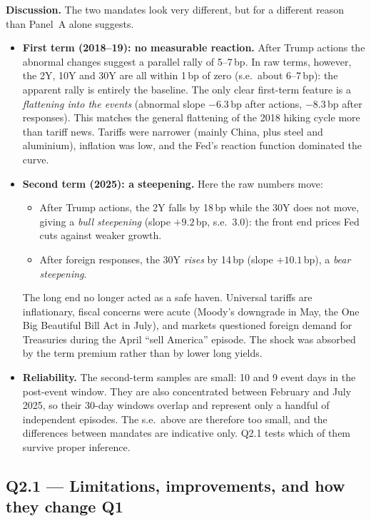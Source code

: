 \documentclass[11pt]{article}
\newcommand{\question}[1]{\subsection*{\textcolor{edhecred}{#1}}}
\begin{document}
\textbf{Discussion.} The two mandates look very different, but for a different
reason than Panel~A alone suggests.
\begin{itemize}[leftmargin=1.2em,nosep]
\item \textbf{First term (2018--19): no measurable reaction.} After Trump
actions the abnormal changes suggest a parallel rally of 5--7\,bp. In raw
terms, however, the 2Y, 10Y and 30Y are all within 1\,bp of zero (s.e.\
about 6--7\,bp): the apparent rally is entirely the baseline. The only clear
first-term feature is a \emph{flattening into the events} (abnormal slope
$-6.3$\,bp after actions, $-8.3$\,bp after responses). This matches the
general flattening of the 2018 hiking cycle more than tariff news. Tariffs
were narrower (mainly China, plus steel and aluminium), inflation was low, and
the Fed's reaction function dominated the curve.
\item \textbf{Second term (2025): a steepening.} Here the raw numbers move:
\begin{itemize}[nosep]
\item After Trump actions, the 2Y falls by 18\,bp while the 30Y does not
move, giving a \emph{bull steepening} (slope $+9.2$\,bp, s.e.\ 3.0): the
front end prices Fed cuts against weaker growth.
\item After foreign responses, the 30Y \emph{rises} by 14\,bp (slope
$+10.1$\,bp), a \emph{bear steepening}.
\end{itemize}
The long end no longer acted as a safe haven. Universal tariffs are
inflationary, fiscal concerns were acute (Moody's downgrade in May, the One
Big Beautiful Bill Act in July), and markets questioned foreign demand for
Treasuries during the April ``sell America'' episode. The shock was absorbed
by the term premium rather than by lower long yields.
\item \textbf{Reliability.} The second-term samples are small: 10 and 9 event
days in the post-event window. They are also concentrated between February and
July 2025, so their 30-day windows overlap and represent only a handful of
independent episodes. The s.e.\ above are therefore too small, and the
differences between mandates are indicative only. Q2.1 tests which of them
survive proper inference.
\end{itemize}

\question{Q2.1 --- Limitations, improvements, and how they change Q1}
\end{document}
